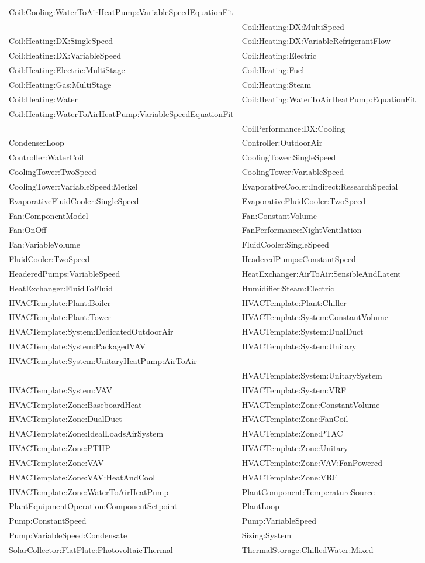 \begin{longtable}[c]{p{3.3in}p{3.3in}}
Coil:Cooling:WaterToAirHeatPump:VariableSpeedEquationFit & \tabularnewline
 & Coil:Heating:DX:MultiSpeed \tabularnewline
Coil:Heating:DX:SingleSpeed & Coil:Heating:DX:VariableRefrigerantFlow \tabularnewline
Coil:Heating:DX:VariableSpeed & Coil:Heating:Electric \tabularnewline
Coil:Heating:Electric:MultiStage & Coil:Heating:Fuel \tabularnewline
Coil:Heating:Gas:MultiStage & Coil:Heating:Steam \tabularnewline
Coil:Heating:Water & Coil:Heating:WaterToAirHeatPump:EquationFit \tabularnewline
Coil:Heating:WaterToAirHeatPump:VariableSpeedEquationFit & \tabularnewline
 & CoilPerformance:DX:Cooling \tabularnewline
CondenserLoop & Controller:OutdoorAir \tabularnewline
Controller:WaterCoil & CoolingTower:SingleSpeed \tabularnewline
CoolingTower:TwoSpeed & CoolingTower:VariableSpeed \tabularnewline
CoolingTower:VariableSpeed:Merkel & EvaporativeCooler:Indirect:ResearchSpecial \tabularnewline
EvaporativeFluidCooler:SingleSpeed & EvaporativeFluidCooler:TwoSpeed \tabularnewline
Fan:ComponentModel & Fan:ConstantVolume \tabularnewline
Fan:OnOff & FanPerformance:NightVentilation \tabularnewline
Fan:VariableVolume & FluidCooler:SingleSpeed \tabularnewline
FluidCooler:TwoSpeed & HeaderedPumps:ConstantSpeed \tabularnewline
HeaderedPumps:VariableSpeed & HeatExchanger:AirToAir:SensibleAndLatent \tabularnewline
HeatExchanger:FluidToFluid & Humidifier:Steam:Electric \tabularnewline
HVACTemplate:Plant:Boiler & HVACTemplate:Plant:Chiller \tabularnewline
HVACTemplate:Plant:Tower & HVACTemplate:System:ConstantVolume \tabularnewline
HVACTemplate:System:DedicatedOutdoorAir & HVACTemplate:System:DualDuct \tabularnewline
HVACTemplate:System:PackagedVAV & HVACTemplate:System:Unitary \tabularnewline
HVACTemplate:System:UnitaryHeatPump:AirToAir & \tabularnewline
 & HVACTemplate:System:UnitarySystem \tabularnewline
HVACTemplate:System:VAV & HVACTemplate:System:VRF \tabularnewline
HVACTemplate:Zone:BaseboardHeat & HVACTemplate:Zone:ConstantVolume \tabularnewline
HVACTemplate:Zone:DualDuct & HVACTemplate:Zone:FanCoil \tabularnewline
HVACTemplate:Zone:IdealLoadsAirSystem & HVACTemplate:Zone:PTAC \tabularnewline
HVACTemplate:Zone:PTHP & HVACTemplate:Zone:Unitary \tabularnewline
HVACTemplate:Zone:VAV & HVACTemplate:Zone:VAV:FanPowered \tabularnewline
HVACTemplate:Zone:VAV:HeatAndCool & HVACTemplate:Zone:VRF \tabularnewline
HVACTemplate:Zone:WaterToAirHeatPump & PlantComponent:TemperatureSource \tabularnewline
PlantEquipmentOperation:ComponentSetpoint & PlantLoop \tabularnewline
Pump:ConstantSpeed & Pump:VariableSpeed \tabularnewline
Pump:VariableSpeed:Condensate & Sizing:System \tabularnewline
SolarCollector:FlatPlate:PhotovoltaicThermal & ThermalStorage:ChilledWater:Mixed \tabularnewline

\end{longtable}
